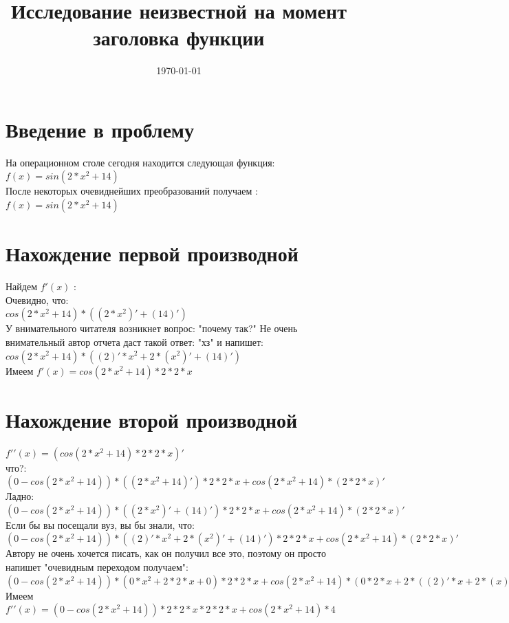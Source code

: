 \documentclass[a4paper]{article}
\title{Исследование неизвестной на момент заголовка функции}
\date{\today}
\begin{document}
\maketitle
\section{Введение в проблему}
На операционном столе сегодня находится следующая функция:\\
$f(x) = sin(2*x^{2}+14)$\\
После некоторых очевиднейших преобразований получаем :\\
$f(x) = sin(2*x^{2}+14)$\\
\section{Нахождение первой производной}
Найдем $f\prime(x)$ :\\Очевидно, что:\\
$cos(2*x^{2}+14)*((2*x^{2})\prime+(14)\prime)$\\
У внимательного читателя возникнет вопрос: "почему так?" Не очень внимательный автор отчета даст такой ответ: "хз" и напишет:\\
$cos(2*x^{2}+14)*((2)\prime*x^{2}+2*(x^{2})\prime+(14)\prime)$\\
Имеем $f\prime(x) = cos(2*x^{2}+14)*2*2*x$\\
\section{Нахождение второй производной}
$f\prime\prime(x) = (cos(2*x^{2}+14)*2*2*x)\prime$\\ 
что?:\\
$(0-cos(2*x^{2}+14))*((2*x^{2}+14)\prime)*2*2*x+cos(2*x^{2}+14)*(2*2*x)\prime$\\
Ладно:\\
$(0-cos(2*x^{2}+14))*((2*x^{2})\prime+(14)\prime)*2*2*x+cos(2*x^{2}+14)*(2*2*x)\prime$\\
Если бы вы посещали вуз, вы бы знали, что:\\
$(0-cos(2*x^{2}+14))*((2)\prime*x^{2}+2*(x^{2})\prime+(14)\prime)*2*2*x+cos(2*x^{2}+14)*(2*2*x)\prime$\\
Автору не очень хочется писать, как он получил все это, поэтому он просто напишет "очевидным переходом получаем":\\
$(0-cos(2*x^{2}+14))*(0*x^{2}+2*2*x+0)*2*2*x+cos(2*x^{2}+14)*(0*2*x+2*((2)\prime*x+2*(x)\prime))$\\
Имеем $f\prime\prime(x) = (0-cos(2*x^{2}+14))*2*2*x*2*2*x+cos(2*x^{2}+14)*4$\\
\end{document}
